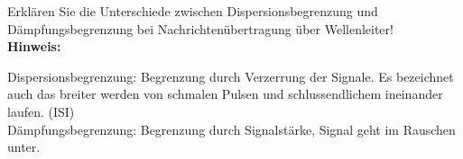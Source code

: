 \begin{question}[section=8,name={Übertragungsgrenzen},difficulty=,quantity=4,type=thr,tags={20131024,20061016}]
	Erklären Sie die Unterschiede zwischen Dispersionsbegrenzung und Dämpfungsbegrenzung bei Nachrichtenübertragung über Wellenleiter!
	\\ \textbf{Hinweis:}\\
	
\end{question}
\begin{solution}
	Dispersionsbegrenzung: Begrenzung durch Verzerrung der Signale. Es bezeichnet auch das breiter werden von schmalen Pulsen und schlussendlichem ineinander laufen. (ISI)\\
	Dämpfungsbegrenzung: Begrenzung durch Signalstärke, Signal geht im Rauschen unter.
\end{solution}
